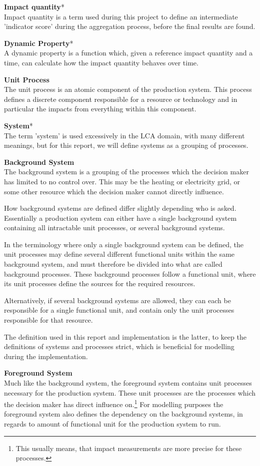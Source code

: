 \textbf{Impact quantity}*\\
Impact quantity is a term used during this project to define an intermediate 'indicator score' during the aggregation process, before the final results are found.

\textbf{Dynamic Property}*\\
A dynamic property is a function which, given a reference impact quantity and a time, can calculate how the impact quantity behaves over time.

\textbf{Unit Process}\\
The unit process is an atomic component of the production system. This process defines a discrete component responsible for a resource or technology and in particular the impacts from everything within this component.

\textbf{System}*\\
The term ’system’ is used excessively in the LCA domain, with many different meanings, but for this report, we will define systems as a grouping of processes.

\textbf{Background System}\\
The background system is a grouping of the processes which the decision maker has limited to no control over. This may be the heating or electricity grid, or some other resource which the decision maker cannot directly influence. 

How background systems are defined differ slightly depending who is asked. Essentially a production system can either have a single background system containing all intractable unit processes, or several background systems. 

In the terminology where only a single background system can be defined, the unit processes may define several different functional units within the same background system, and must therefore be divided into what are called background processes. These background processes follow a functional unit, where its unit processes define the sources for the required resources. 

Alternatively, if several background systems are allowed, they can each be responsible for a single functional unit, and contain only the unit processes responsible for that resource. 

The definition used in this report and implementation is the latter, to keep the definitions of systems and processes strict, which is beneficial for modelling during the implementation. 

\textbf{Foreground System}\\
Much like the background system, the foreground system contains unit processes necessary for the production system. These unit processes are the processes which the decision maker has direct influence on.\footnote{This usually means, that impact measurements are more precise for these processes.} For modelling purposes the foreground system also defines the dependency on the background systems, in regards to amount of functional unit for the production system to run.